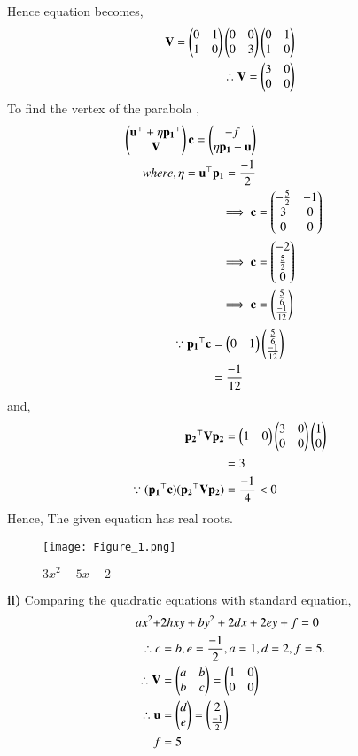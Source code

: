 \documentclass[journal,12pt,twocolumn]{IEEEtran}
\begin{document}
Hence equation becomes,
\begin{align}
    \mathbf{V}= \begin{pmatrix} 0 & 1 \\ 1 & 0\end{pmatrix}\begin{pmatrix}0 & 0 \\ 0 & 3\end{pmatrix}\begin{pmatrix} 0 & 1 \\ 1 & 0\end{pmatrix}\\
    \therefore \mathbf{V}=\begin{pmatrix}3 & 0 \\ 0 & 0\end{pmatrix}
\end{align}
To find the vertex of the parabola ,
\begin{align}
    \begin{pmatrix}\mathbf{u}^{\top}+ \eta \mathbf{p_1}^{\top} \\ \mathbf{V}\end{pmatrix}\mathbf{c} = \begin{pmatrix}-f \\ \eta \mathbf{p_1}-\mathbf{u}\end{pmatrix}\\
    where, \eta = \mathbf{u}^{\top}\mathbf{p_1}= \frac{-1}{2}\\
    \implies
    \mathbf{c}&=\begin{pmatrix}-\frac{5}{2}& -1 \\ 3 & 0 \\ 0 & 0\end{pmatrix}\\ \implies \mathbf{c}& = \begin{pmatrix}-2 \\ \frac{5}{2}\\ 0\end{pmatrix}\\ \implies
    \mathbf{c}&=\begin{pmatrix}\frac{5}{6} \\\frac{-1}{12}\end{pmatrix}
\end{align}
\begin{align}
    \because \mathbf{p_1}^{\top}\mathbf{c} &= \begin{pmatrix}0 & 1\end{pmatrix}\begin{pmatrix}\frac{5}{6} \\\frac{-1}{12}\end{pmatrix}\\
    &= \frac{-1}{12}
\end{align}
and,
\begin{align}
    \mathbf{p_2}^{\top}\mathbf{V}\mathbf{p_2}&= \begin{pmatrix}1 & 0\end{pmatrix}\begin{pmatrix}3 & 0 \\ 0 & 0\end{pmatrix}\begin{pmatrix}1 \\ 0\end{pmatrix}\\
    &= 3\\
    \because (\mathbf{p_1}^{\top}\mathbf{c}) (\mathbf{p_2}^{\top}\mathbf{V}\mathbf{p_2})&=\frac{-1}{4}<0 
\end{align}
Hence, The given equation has real roots.\\
\begin{figure}[htp]
    \centering
    \texttt{[image: Figure\_1.png]}
    \caption{$3x^2-5x+2$}
\end{figure}
\textbf{ii)}
Comparing the quadratic equations with standard equation,
\begin{align}
    ax^2+&2hxy+by^2+2dx+2ey+f=0\\
    \therefore c&=b,e=\frac{-1}{2}, a=1,d=2,f=5.\\
    \therefore \mathbf{V}&=\begin{pmatrix}a & b \\ b & c\end{pmatrix}=\begin{pmatrix}1 & 0 \\ 0 & 0\end{pmatrix}\\ \therefore \mathbf{u}&=\begin{pmatrix}d \\ e\end{pmatrix}= \begin{pmatrix}2 \\ \frac{-1}{2}\end{pmatrix}\\ f&=5
\end{align}
\end{document}
